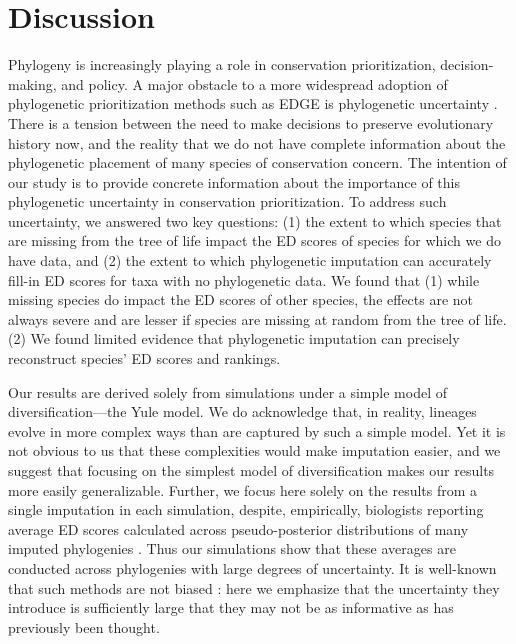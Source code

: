 \documentclass[12pt,english]{article}
\begin{document}
\section*{Discussion}
Phylogeny is increasingly playing a role in conservation prioritization,
decision-making, and policy. A major obstacle to a more widespread adoption of
phylogenetic prioritization methods such as EDGE is phylogenetic uncertainty
\autocite{Collen2015}. There is a tension between the need to make decisions to
preserve evolutionary history now, and the reality that we do not have complete information
about the phylogenetic placement of many species of conservation concern. The intention of
our study is to provide concrete information about the importance of this phylogenetic
uncertainty in conservation prioritization. To address such
uncertainty, we answered two key questions: (1) the extent to which species that
are missing from the tree of life impact the ED scores of species for which we
do have data, and (2) the extent to which phylogenetic imputation can accurately
fill-in ED scores for taxa with no phylogenetic data. We found that (1) while
missing species do impact the ED scores of other species, the effects are not
always severe and are lesser if species are missing at random from the tree of
life. (2) We found limited evidence that phylogenetic imputation can precisely
reconstruct species' ED scores and rankings.

Our results are derived solely from simulations under a simple model of
diversification---the Yule model. We do acknowledge that, in reality, lineages
evolve in more complex ways than are captured by such a simple model. Yet it is
not obvious to us that these complexities would make imputation easier, and we
suggest that focusing on the simplest model of diversification makes our results
more easily generalizable. Further, we focus here solely on the results from a
single imputation in each simulation, despite, empirically, biologists reporting
average ED scores calculated across pseudo-posterior distributions
of many imputed phylogenies \autocite{Kuhn2011}. Thus our simulations show that these averages
are conducted across phylogenies with large degrees of uncertainty. It is
well-known that such methods are not biased \autocite[indeed, this was
originally shown by][]{Kuhn2011}: here we emphasize that the uncertainty they
introduce is sufficiently large that they may not be as informative as has
previously been thought.
\end{document}
